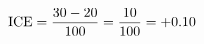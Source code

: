 \documentclass[preview]{standalone}
\begin{document}
\begin{align*}
\special{dvisvgm:raw <g id='unique000'>}\text{ICE} = \frac{30 - 20}{100} = \frac{10}{100} = +0.10\special{dvisvgm:raw </g>}
\end{align*}
\end{document}

